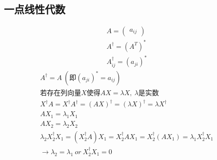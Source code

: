 \subsection{一点线性代数}
\begin{gather}
    A=\begin{pmatrix}
        a_{ij}
    \end{pmatrix}\\
    A^{\dagger}=(A^{T})^{*}\\
    A^{\dagger}_{ij} = (a_{ji})^{*}
\end{gather}
\begin{gather}
    A^{\dagger}=A\ (\text{即}(a_{ji})^{*}=a_{ij})\\
    \text{若存在列向量}X\text{使得}AX=\lambda X,\ \lambda\text{是实数}\\
    X^{\dagger}A=X^{\dagger}A^{\dagger}=(AX)^{\dagger}=(\lambda X)^{\dagger}=\lambda X^{\dagger}\\
    AX_{1}=\lambda_{1} X_{1}\\
    AX_{2}=\lambda_{2} X_{2}\\
    \lambda_{2}X_{2}^{\dagger}X_{1}=(X_{2}^{\dagger}A)X_{1}=X_{2}^{\dagger}AX_{1}=X_{2}^{\dagger}(AX_{1})=\lambda_{1}X_{2}^{\dagger}X_{1}\\
    \rightarrow \lambda_{2}=\lambda_{1}\ or\ X_{2}^{\dagger}X_{1}=0 \label{eq:OrthogonalEigenVector}
\end{gather}

